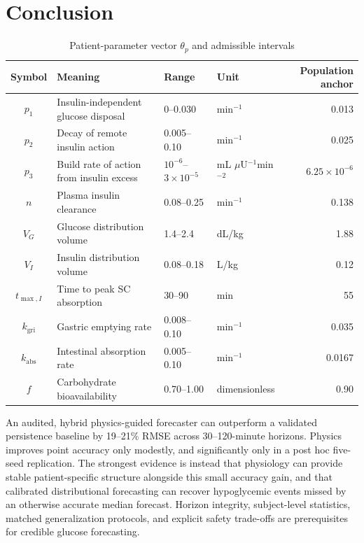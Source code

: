 \documentclass[journal]{IEEEtran}
\begin{document}
\section{Conclusion}
\begin{table}[t]
\centering
\caption{Patient-parameter vector $\theta_p$ and admissible intervals}
\label{tab:params}
\footnotesize
\begin{tabular}{clllr}
\toprule
Symbol & Meaning & Range & Unit & Population anchor \\
\midrule
$p_1$ & Insulin-independent glucose disposal & 0--0.030 & min$^{-1}$ & 0.013 \\
$p_2$ & Decay of remote insulin action & 0.005--0.10 & min$^{-1}$ & 0.025 \\
$p_3$ & Build rate of action from insulin excess & $10^{-6}$--$3\times10^{-5}$ & mL $\mu$U$^{-1}$min$^{-2}$ & $6.25\times10^{-6}$ \\
$n$ & Plasma insulin clearance & 0.08--0.25 & min$^{-1}$ & 0.138 \\
$V_G$ & Glucose distribution volume & 1.4--2.4 & dL/kg & 1.88 \\
$V_I$ & Insulin distribution volume & 0.08--0.18 & L/kg & 0.12 \\
$t_{\max,I}$ & Time to peak SC absorption & 30--90 & min & 55 \\
$k_{\text{gri}}$ & Gastric emptying rate & 0.008--0.10 & min$^{-1}$ & 0.035 \\
$k_{\text{abs}}$ & Intestinal absorption rate & 0.005--0.10 & min$^{-1}$ & 0.0167 \\
$f$ & Carbohydrate bioavailability & 0.70--1.00 & dimensionless & 0.90 \\
\bottomrule
\end{tabular}
\end{table}

An audited, hybrid physics-guided forecaster can outperform a validated persistence baseline by 19--21\% RMSE across 30--120-minute horizons. Physics improves point accuracy only modestly, and significantly only in a post hoc five-seed replication. The strongest evidence is instead that physiology can provide stable patient-specific structure alongside this small accuracy gain, and that calibrated distributional forecasting can recover hypoglycemic events missed by an otherwise accurate median forecast. Horizon integrity, subject-level statistics, matched generalization protocols, and explicit safety trade-offs are prerequisites for credible glucose forecasting.

\newpage\null\newpage
\appendices
\end{document}
